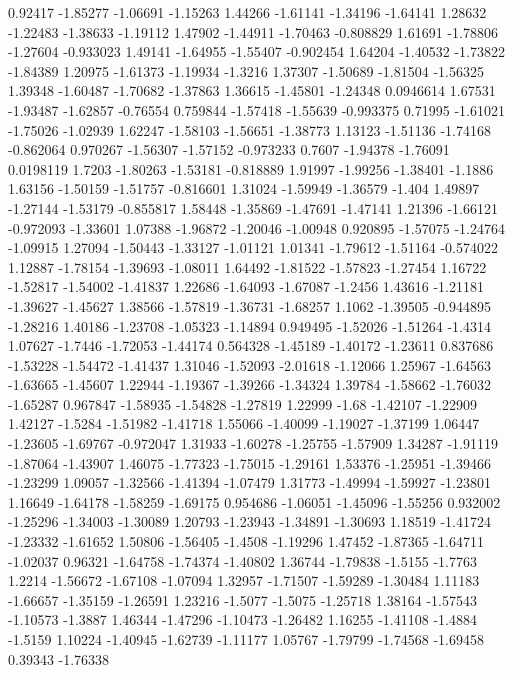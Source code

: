 \documentclass[9pt]{article}
\theoremstyle{plain}
\theoremstyle{definition}
\theoremstyle{remark}
\numberwithin{equation}{section}
\begin{document}
0.92417
-1.85277
-1.06691
-1.15263
1.44266
-1.61141
-1.34196
-1.64141
1.28632
-1.22483
-1.38633
-1.19112
1.47902
-1.44911
-1.70463
-0.808829
1.61691
-1.78806
-1.27604
-0.933023
1.49141
-1.64955
-1.55407
-0.902454
1.64204
-1.40532
-1.73822
-1.84389
1.20975
-1.61373
-1.19934
-1.3216
1.37307
-1.50689
-1.81504
-1.56325
1.39348
-1.60487
-1.70682
-1.37863
1.36615
-1.45801
-1.24348
0.0946614
1.67531
-1.93487
-1.62857
-0.76554
0.759844
-1.57418
-1.55639
-0.993375
0.71995
-1.61021
-1.75026
-1.02939
1.62247
-1.58103
-1.56651
-1.38773
1.13123
-1.51136
-1.74168
-0.862064
0.970267
-1.56307
-1.57152
-0.973233
0.7607
-1.94378
-1.76091
0.0198119
1.7203
-1.80263
-1.53181
-0.818889
1.91997
-1.99256
-1.38401
-1.1886
1.63156
-1.50159
-1.51757
-0.816601
1.31024
-1.59949
-1.36579
-1.404
1.49897
-1.27144
-1.53179
-0.855817
1.58448
-1.35869
-1.47691
-1.47141
1.21396
-1.66121
-0.972093
-1.33601
1.07388
-1.96872
-1.20046
-1.00948
0.920895
-1.57075
-1.24764
-1.09915
1.27094
-1.50443
-1.33127
-1.01121
1.01341
-1.79612
-1.51164
-0.574022
1.12887
-1.78154
-1.39693
-1.08011
1.64492
-1.81522
-1.57823
-1.27454
1.16722
-1.52817
-1.54002
-1.41837
1.22686
-1.64093
-1.67087
-1.2456
1.43616
-1.21181
-1.39627
-1.45627
1.38566
-1.57819
-1.36731
-1.68257
1.1062
-1.39505
-0.944895
-1.28216
1.40186
-1.23708
-1.05323
-1.14894
0.949495
-1.52026
-1.51264
-1.4314
1.07627
-1.7446
-1.72053
-1.44174
0.564328
-1.45189
-1.40172
-1.23611
0.837686
-1.53228
-1.54472
-1.41437
1.31046
-1.52093
-2.01618
-1.12066
1.25967
-1.64563
-1.63665
-1.45607
1.22944
-1.19367
-1.39266
-1.34324
1.39784
-1.58662
-1.76032
-1.65287
0.967847
-1.58935
-1.54828
-1.27819
1.22999
-1.68
-1.42107
-1.22909
1.42127
-1.5284
-1.51982
-1.41718
1.55066
-1.40099
-1.19027
-1.37199
1.06447
-1.23605
-1.69767
-0.972047
1.31933
-1.60278
-1.25755
-1.57909
1.34287
-1.91119
-1.87064
-1.43907
1.46075
-1.77323
-1.75015
-1.29161
1.53376
-1.25951
-1.39466
-1.23299
1.09057
-1.32566
-1.41394
-1.07479
1.31773
-1.49994
-1.59927
-1.23801
1.16649
-1.64178
-1.58259
-1.69175
0.954686
-1.06051
-1.45096
-1.55256
0.932002
-1.25296
-1.34003
-1.30089
1.20793
-1.23943
-1.34891
-1.30693
1.18519
-1.41724
-1.23332
-1.61652
1.50806
-1.56405
-1.4508
-1.19296
1.47452
-1.87365
-1.64711
-1.02037
0.96321
-1.64758
-1.74374
-1.40802
1.36744
-1.79838
-1.5155
-1.7763
1.2214
-1.56672
-1.67108
-1.07094
1.32957
-1.71507
-1.59289
-1.30484
1.11183
-1.66657
-1.35159
-1.26591
1.23216
-1.5077
-1.5075
-1.25718
1.38164
-1.57543
-1.10573
-1.3887
1.46344
-1.47296
-1.10473
-1.26482
1.16255
-1.41108
-1.4884
-1.5159
1.10224
-1.40945
-1.62739
-1.11177
1.05767
-1.79799
-1.74568
-1.69458
0.39343
-1.76338
\end{document}
